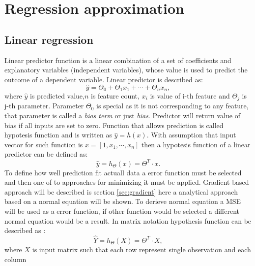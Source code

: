 \section{Regression approximation}

\subsection{Linear regression}
\label{sec:linear_regression}
Linear predictor function is a linear combination of a set of coefficients and explanatory 
variables (independent variables), whose value is used to predict the outcome of a
dependent variable. Linear predictor is described as:
\begin{equation}
	\label{equ:linear_predictior}
	\hat{y} = \Theta_{0} + \Theta_{1}x_{1} + \cdots + \Theta_{n}x_{n},
\end{equation}
where $\hat{y}$ is predicted value,$n$ is feature count, $x_{i}$ is value of i-th feature
and $\Theta_{j}$ is j-th parameter.
Parameter $\Theta_{0}$ is special as it is not corresponding to any feature, that parameter
is called a \textit{bias term} or just \textit{bias}.
Predictor will return value of bias if all inputs are set to zero.
Function that allows prediction is called hypotesis function and is written as $\hat{y} = h(x)$.
With assumption that input vector for such function is $x=[1, x_{1}, \cdots, x_{n}]$ then 
a hypotesis function of a linear predictor can be defined as:
\begin{equation}
	\label{equ:linear_hyp}
	\hat{y} = h_{\Theta}(x) = \Theta^{T}\cdot x.
\end{equation}
To define how well prediction fit actuall data a error function must be selected and then one
of to approaches for minimizing it must be applied. Gradient based approach will be described 
is section \ref{sec:gradient} here a analytical approach based on a normal equation will be shown.
To derieve normal equation a MSE will be used as a error function, if other function would be 
selected a different normal equation would be a result.
In matrix notation hypothesis function can be described as :
\begin{equation}
	\label{equ:linear_hyp_matirx}
	\hat{Y} = h_{\Theta}(X) = \Theta^{T}\cdot X,
\end{equation}
where $X$ is input matrix such that each row represent single observation and each column 
